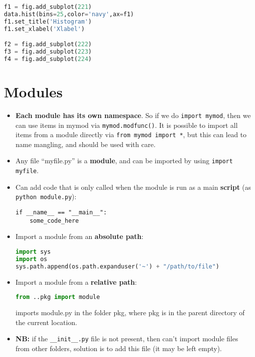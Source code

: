 \documentclass[11pt]{article}
\begin{document}
\begin{multicols*}{3}
\begin{lstlisting}[language=Python,linewidth=0.95\linewidth]
f1 = fig.add_subplot(221)
data.hist(bins=25,color='navy',ax=f1)
f1.set_title('Histogram')
f1.set_xlabel('Xlabel')

f2 = fig.add_subplot(222)
f3 = fig.add_subplot(223)
f4 = fig.add_subplot(224)
\end{lstlisting}


\section{Modules}

\begin{itemize}[wide = 4pt, labelindent=\parindent]
\item \textbf{Each module has its own namespace}. So if we do \verb+import mymod+, then we can use items in mymod via \verb+mymod.modfunc()+. It is possible to import all items from a module directly via \verb+from mymod import *+, but this can lead to name mangling, and should be used with care.   
    
\item Any file ``myfile.py'' is a \textbf{module}, and can be imported by using \verb+import myfile+.

\item Can add code that is only called when the module is run as a main \textbf{script} (as \verb~python module.py~):
  \vspace{2pt}
\begin{lstlisting}[linewidth=0.95\linewidth]
if __name__ == "__main__":
    some_code_here
\end{lstlisting}

\item Import a module from an \textbf{absolute path}:
\begin{lstlisting}[language=Python,linewidth=0.95\linewidth]
import sys
import os
sys.path.append(os.path.expanduser('~') + "/path/to/file")
\end{lstlisting}

\item Import a module from a \textbf{relative path}:
\begin{lstlisting}[language=Python,linewidth=0.95\linewidth]
  from ..pkg import module
\end{lstlisting}
imports module.py in the folder pkg, where pkg is in the parent directory of the current location. 

\item \textbf{NB:} if the \verb~__init__.py~ file is not present, then can't import module files from other folders, solution is to add this file (it may be left empty).


\end{itemize}
\end{multicols*}
\end{document}
